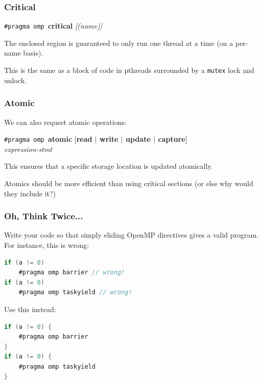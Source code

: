 \begin{frame}
\frametitle{Critical}

 \begin{center}
    {\tt \#pragma omp }{\bf critical} {\it [(name)]}
  \end{center}

    The enclosed region is guaranteed to only run one thread at a time
      (on a per-name basis).
    
    This is the same as a block of code in pthreads surrounded by a {\tt mutex} lock
      and unlock.

\end{frame}


\begin{frame}
\frametitle{Atomic}

We can also request atomic operations:

    {\tt \#pragma omp }{\bf atomic} [{\bf read $\mid$ write $\mid$ update $\mid$ capture}]\\
    {\it expression-stmt}
    
This ensures that a specific storage location is updated
    atomically.  
    
    Atomics should be more efficient than using critical
    sections (or else why would they include it?)


\end{frame}



\begin{frame}[fragile]
\frametitle{Oh, Think Twice...}

 Write your code so that simply eliding OpenMP directives gives a valid program. For instance, this is wrong:
  \begin{lstlisting}[language=C,morekeywords={foreach,pragma,omp,parallel,single,nowait,task,untied,barrier,taskyield}]
if (a != 0)
    #pragma omp barrier // wrong!
if (a != 0)
    #pragma omp taskyield // wrong!
  \end{lstlisting}

  Use this instead:
  \begin{lstlisting}[language=C,morekeywords={foreach,pragma,omp,parallel,single,nowait,task,untied,barrier,taskyield}]
if (a != 0) {
    #pragma omp barrier
}
if (a != 0) {
    #pragma omp taskyield
}
  \end{lstlisting}


\end{frame}





